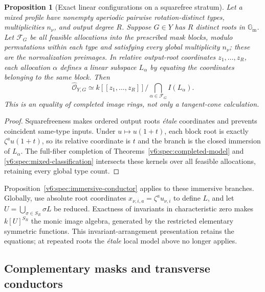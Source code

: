\documentclass[10pt,fleqn]{article}
\numberwithin{equation}{section}
\newtheorem{proposition}[theorem]{Proposition}
\newcommand{\Gm}{\mathbb G_{\mathrm m}}
\begin{document}
\begin{proposition}[Exact linear configurations on a squarefree stratum]
\label{v7:linear:exact}
Let a mixed profile have nonempty aperiodic pairwise rotation-distinct
types, multiplicities $n_\nu$, and output degree $R$.
Suppose $G\in Y$ has $R$ distinct roots in $\Gm$.
Let $\mathcal F_G$ be all feasible allocations into the prescribed mask
blocks, modulo permutations within each type and satisfying every
global multiplicity $n_\nu$; these are the normalization preimages.
In relative output-root coordinates $z_1,\ldots,z_R$, each allocation
$\alpha$ defines a linear subspace $L_\alpha$ by equating the coordinates
belonging to the same block.  Then
\[
 \widehat{\mathcal O}_{Y,G}
   \simeq k[[z_1,\ldots,z_R]]/\bigcap_{\alpha\in\mathcal F_G}I(L_\alpha).
\]
This is an equality of completed image rings, not only a tangent-cone
calculation.
\end{proposition}
\begin{proof}
Squarefreeness makes ordered output roots \emph{\'etale} coordinates
and prevents coincident same-type inputs.  Under $u\mapsto u(1+t)$,
each block root is exactly $\zeta^au(1+t)$, so its relative coordinate
is $t$ and the branch is the closed immersion of $L_\alpha$.
The full-fiber completion of Theorems~\ref{v6:spec:completed-model}
and \ref{v6:spec:mixed-classification} intersects these kernels over
all feasible allocations, retaining every global type count.
\end{proof}

Proposition~\ref{v6:spec:immersive-conductor} applies to these immersive
branches.  Globally, use absolute root coordinates
$x_{\nu,i,a}=\zeta^a u_{\nu,i}$ to define $L$, and let
$U=\bigcup_{\sigma\in S_R}\sigma L$ be reduced.
Exactness of invariants in characteristic zero makes $k[U]^{S_R}$
the monic image algebra, generated by the restricted elementary
symmetric functions.  This invariant-arrangement presentation
\cite{BrooknerCorwinEtingofSam} retains the equations; at repeated roots
the \emph{\'etale} local model above no longer applies.

\subsection{Complementary masks and transverse conductors}
\label{r27:linear:transverse}
\end{document}
